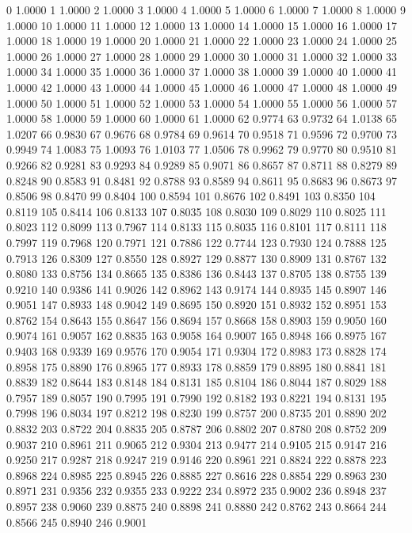 0 1.0000
1 1.0000
2 1.0000
3 1.0000
4 1.0000
5 1.0000
6 1.0000
7 1.0000
8 1.0000
9 1.0000
10 1.0000
11 1.0000
12 1.0000
13 1.0000
14 1.0000
15 1.0000
16 1.0000
17 1.0000
18 1.0000
19 1.0000
20 1.0000
21 1.0000
22 1.0000
23 1.0000
24 1.0000
25 1.0000
26 1.0000
27 1.0000
28 1.0000
29 1.0000
30 1.0000
31 1.0000
32 1.0000
33 1.0000
34 1.0000
35 1.0000
36 1.0000
37 1.0000
38 1.0000
39 1.0000
40 1.0000
41 1.0000
42 1.0000
43 1.0000
44 1.0000
45 1.0000
46 1.0000
47 1.0000
48 1.0000
49 1.0000
50 1.0000
51 1.0000
52 1.0000
53 1.0000
54 1.0000
55 1.0000
56 1.0000
57 1.0000
58 1.0000
59 1.0000
60 1.0000
61 1.0000
62 0.9774
63 0.9732
64 1.0138
65 1.0207
66 0.9830
67 0.9676
68 0.9784
69 0.9614
70 0.9518
71 0.9596
72 0.9700
73 0.9949
74 1.0083
75 1.0093
76 1.0103
77 1.0506
78 0.9962
79 0.9770
80 0.9510
81 0.9266
82 0.9281
83 0.9293
84 0.9289
85 0.9071
86 0.8657
87 0.8711
88 0.8279
89 0.8248
90 0.8583
91 0.8481
92 0.8788
93 0.8589
94 0.8611
95 0.8683
96 0.8673
97 0.8506
98 0.8470
99 0.8404
100 0.8594
101 0.8676
102 0.8491
103 0.8350
104 0.8119
105 0.8414
106 0.8133
107 0.8035
108 0.8030
109 0.8029
110 0.8025
111 0.8023
112 0.8099
113 0.7967
114 0.8133
115 0.8035
116 0.8101
117 0.8111
118 0.7997
119 0.7968
120 0.7971
121 0.7886
122 0.7744
123 0.7930
124 0.7888
125 0.7913
126 0.8309
127 0.8550
128 0.8927
129 0.8877
130 0.8909
131 0.8767
132 0.8080
133 0.8756
134 0.8665
135 0.8386
136 0.8443
137 0.8705
138 0.8755
139 0.9210
140 0.9386
141 0.9026
142 0.8962
143 0.9174
144 0.8935
145 0.8907
146 0.9051
147 0.8933
148 0.9042
149 0.8695
150 0.8920
151 0.8932
152 0.8951
153 0.8762
154 0.8643
155 0.8647
156 0.8694
157 0.8668
158 0.8903
159 0.9050
160 0.9074
161 0.9057
162 0.8835
163 0.9058
164 0.9007
165 0.8948
166 0.8975
167 0.9403
168 0.9339
169 0.9576
170 0.9054
171 0.9304
172 0.8983
173 0.8828
174 0.8958
175 0.8890
176 0.8965
177 0.8933
178 0.8859
179 0.8895
180 0.8841
181 0.8839
182 0.8644
183 0.8148
184 0.8131
185 0.8104
186 0.8044
187 0.8029
188 0.7957
189 0.8057
190 0.7995
191 0.7990
192 0.8182
193 0.8221
194 0.8131
195 0.7998
196 0.8034
197 0.8212
198 0.8230
199 0.8757
200 0.8735
201 0.8890
202 0.8832
203 0.8722
204 0.8835
205 0.8787
206 0.8802
207 0.8780
208 0.8752
209 0.9037
210 0.8961
211 0.9065
212 0.9304
213 0.9477
214 0.9105
215 0.9147
216 0.9250
217 0.9287
218 0.9247
219 0.9146
220 0.8961
221 0.8824
222 0.8878
223 0.8968
224 0.8985
225 0.8945
226 0.8885
227 0.8616
228 0.8854
229 0.8963
230 0.8971
231 0.9356
232 0.9355
233 0.9222
234 0.8972
235 0.9002
236 0.8948
237 0.8957
238 0.9060
239 0.8875
240 0.8898
241 0.8880
242 0.8762
243 0.8664
244 0.8566
245 0.8940
246 0.9001
